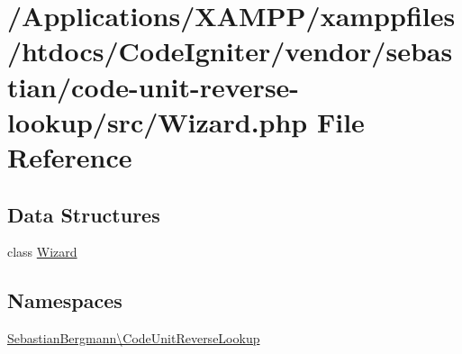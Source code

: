 \hypertarget{_wizard_8php}{}\section{/\+Applications/\+X\+A\+M\+P\+P/xamppfiles/htdocs/\+Code\+Igniter/vendor/sebastian/code-\/unit-\/reverse-\/lookup/src/\+Wizard.php File Reference}
\label{_wizard_8php}
\subsection*{Data Structures}
\begin{DoxyCompactItemize}
\item 
class \mbox{\hyperlink{class_sebastian_bergmann_1_1_code_unit_reverse_lookup_1_1_wizard}{Wizard}}
\end{DoxyCompactItemize}
\subsection*{Namespaces}
\begin{DoxyCompactItemize}
\item 
 \mbox{\hyperlink{namespace_sebastian_bergmann_1_1_code_unit_reverse_lookup}{Sebastian\+Bergmann\textbackslash{}\+Code\+Unit\+Reverse\+Lookup}}
\end{DoxyCompactItemize}

